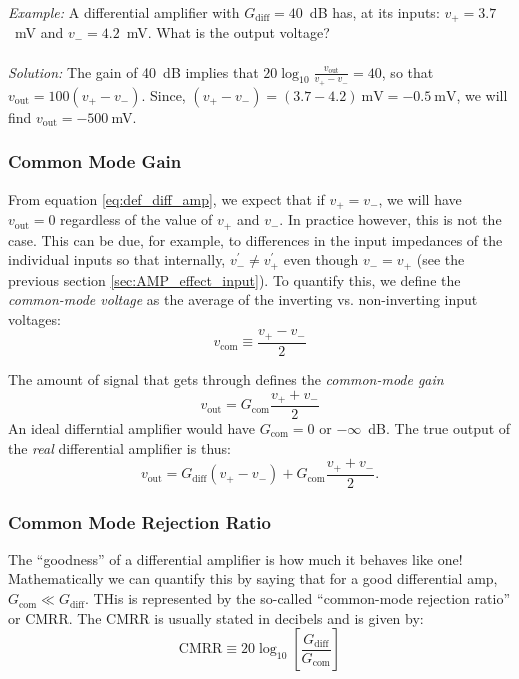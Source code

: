 \documentclass[]{article}
\begin{document}
\textit{Example:} A differential amplifier with $G_\text{diff} = 40$~dB has, at its inputs: $v_+ = 3.7$~mV and $v_- = 4.2$~mV. What is the output voltage?\\\\
\textit{Solution:} The gain of 40~dB implies that $20\log_{10}\frac{v_\text{out}}{v_+-v_-} = 40$, so that $v_\text{out} = 100\left(v_+-v_-\right)$. Since, $\left(v_+-v_-\right) = \left(3.7-4.2\right)~\text{mV} = -0.5~\text{mV}$, we will find $v_\text{out} = -500~$mV.
\subsubsection{Common Mode Gain}
From equation \ref{eq:def_diff_amp}, we expect that if $v_+ = v_-$, we will have $v_\text{out} = 0$ regardless of the value of $v_+$ and $v_-$. In practice however, this is not the case. This can be due, for example, to differences in the input impedances of the individual inputs so that internally, $v_-^\prime \neq v_+^\prime$ even though $v_- = v_+$ (see the previous section \ref{sec:AMP_effect_input}). To quantify this, we define the \textit{common-mode voltage} as the average of the inverting vs. non-inverting input voltages:
\begin{equation}
\label{eq:common_mode_voltage}
v_\text{com} \equiv \frac{v_+-v_-}{2}
\end{equation}

The amount of signal that gets through defines the \textit{common-mode gain}
\begin{equation}
\label{eq:common_mode_gain}
v_\text{out} = G_\text{com}\frac{v_++v_-}{2}
\end{equation}
An ideal differntial amplifier would have $G_\text{com} = 0$ or $-\infty$~dB. The true output of the \textit{real} differential amplifier is thus:
\begin{equation}
\label{eq:real_diff_amp}
v_\text{out} = G_\text{diff}\left(v_+-v_-\right) + G_\text{com}\frac{v_++v_-}{2}.
\end{equation}

\subsubsection{Common Mode Rejection Ratio}
The ``goodness'' of a differential amplifier is how much it behaves like one! Mathematically we can quantify this by saying that for a good differential amp, $G_\text{com} \ll G_\text{diff}$. THis is represented by the so-called ``common-mode rejection ratio'' or CMRR. The CMRR is usually stated in decibels and is given by:
\begin{equation}
\label{eq:def_CMRR}
\text{CMRR} \equiv 20\log_{10}\left[\frac{G_\text{diff}}{G_\text{com}}\right]
\end{equation}
 
\end{document}
